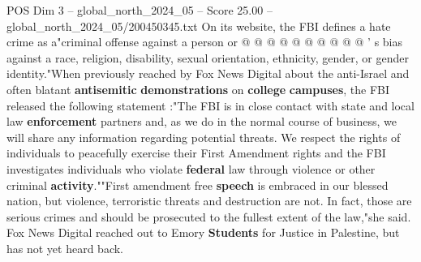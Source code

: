 \begin{textsample}{POS Dim 3 – global\_north\_2024\_05 – Score 25.00 – global\_north\_2024\_05/200450345.txt}
On its website, the FBI defines a hate crime as a"criminal offense against a person or @ @ @ @ @ @ @ @ @ @ ' s bias against a race, religion, disability, sexual orientation, ethnicity, gender, or gender identity."When previously reached by Fox News Digital about the anti-Israel and often blatant \textbf{antisemitic} \textbf{demonstrations} on \textbf{college} \textbf{campuses}, the FBI released the following statement :"The FBI is in close contact with state and local law \textbf{enforcement} partners and, as we do in the normal course of business, we will share any information regarding potential threats.
We respect the rights of individuals to peacefully exercise their First Amendment rights and the FBI investigates individuals who violate \textbf{federal} law through violence or other criminal \textbf{activity}.""First amendment free \textbf{speech} is embraced in our blessed nation, but violence, terroristic threats and destruction are not.
In fact, those are serious crimes and should be prosecuted to the fullest extent of the law,"she said.
Fox News Digital reached out to Emory \textbf{Students} for Justice in Palestine, but has not yet heard back.

\end{textsample}
